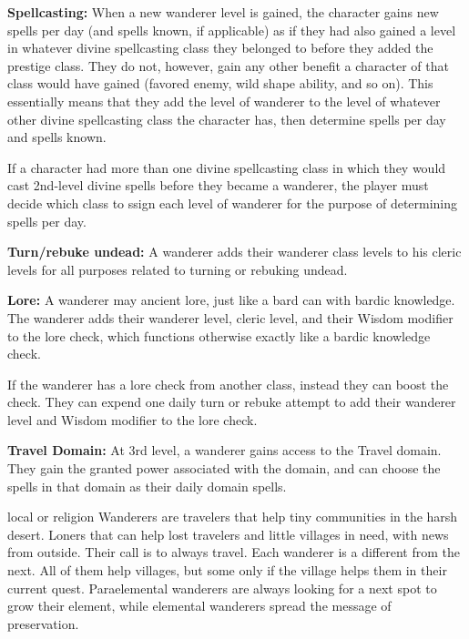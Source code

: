 {
\textbf{Spellcasting:} When a new wanderer level is gained, the character gains new spells per day (and spells known, if applicable) as if they had also gained a level in whatever divine spellcasting class they belonged to before they added the prestige class. They do not, however, gain any other benefit a character of that class would have gained (favored enemy, wild shape ability, and so on). This essentially means that they add the level of wanderer to the level of whatever other divine spellcasting class the character has, then determine spells per day and spells known.

If a character had more than one divine spellcasting class in which they would cast 2nd-level divine spells before they became a wanderer, the player must decide which class to ssign each level of wanderer for the purpose of determining spells per day.

\textbf{Turn/rebuke undead:} A wanderer adds their wanderer class levels to his cleric levels for all purposes related to turning or rebuking undead.

\textbf{Lore:} A wanderer may ancient lore, just like a bard can with bardic knowledge. The wanderer adds their wanderer level, cleric level, and their Wisdom modifier to the lore check, which functions otherwise exactly like a bardic knowledge check.

If the wanderer has a lore check from another class, instead they can boost the check. They can expend one daily turn or rebuke attempt to add their wanderer level and Wisdom modifier to the lore check.

\textbf{Travel Domain:} At 3rd level, a wanderer gains access to the Travel domain. They gain the granted power associated with the domain, and can choose the spells in that domain as their daily domain spells.
}
{}
{local or religion}
{Wanderers are travelers that help tiny communities in the harsh desert.}
{Loners that can help lost travelers and little villages in need, with news from outside. Their call is to always travel.}
{Each wanderer is a different from the next. All of them help villages, but some only if the village helps them in their current quest. Paraelemental wanderers are always looking for a next spot to grow their element, while elemental wanderers spread the message of preservation.}